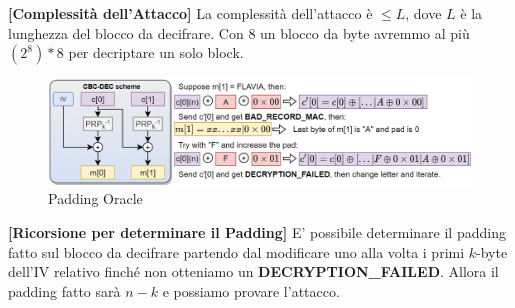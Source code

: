 \begin{example}
\begin{note}\textbf{[Complessità dell'Attacco]}
La complessità dell'attacco è $\leq{L}$, dove $L$ è la lunghezza del blocco da decifrare. Con 8 un blocco da byte avremmo al più $(2^8)*8$ per decriptare un solo block.
\end{note}
\begin{figure}[h]
    \centering
    \includegraphics{image/padoracle.png}
    \caption{Padding Oracle}
    \label{fig:padoracle}
\end{figure}
\begin{note}\textbf{[Ricorsione per determinare il Padding]}
E' possibile determinare il padding fatto sul blocco da decifrare partendo dal modificare uno alla volta i primi $k$-byte dell'IV relativo finché non otteniamo un \textbf{DECRYPTION\_FAILED}. Allora il padding fatto sarà $n-k$ e possiamo provare l'attacco.
\end{note}
\end{example}
